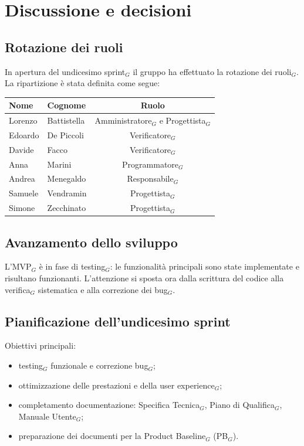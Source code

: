 \documentclass[a4paper, 10pt, colorlinks=true, linkcolor=black, urlcolor=blue, citecolor=blue, hidelinks]{article}
\begin{document}
\section{Discussione e decisioni}

\subsection{Rotazione dei ruoli}
In apertura del undicesimo sprint$_G$ il gruppo ha effettuato la rotazione dei ruoli$_G$. La ripartizione è stata definita come segue:
\begin{center}
    \begin{tabular}{|l|l|c|}
        \hline
        \textbf{Nome} & \textbf{Cognome} & \textbf{Ruolo} \\
        \hline
        Lorenzo & Battistella & Amministratore$_G$ e Progettista$_G$ \\
        \hline
        Edoardo & De Piccoli & Verificatore$_G$ \\
        \hline
        Davide & Facco & Verificatore$_G$ \\
        \hline
        Anna & Marini & Programmatore$_G$ \\
        \hline
        Andrea & Menegaldo & Responsabile$_G$ \\
        \hline
        Samuele & Vendramin & Progettista$_G$ \\
        \hline
        Simone & Zecchinato & Progettista$_G$ \\
        \hline
    \end{tabular}
\end{center}

\subsection{Avanzamento dello sviluppo}
L'MVP$_G$ è in fase di testing$_G$: le funzionalità principali sono state implementate e risultano funzionanti. L'attenzione si sposta ora dalla scrittura del codice alla verifica$_G$ sistematica e alla correzione dei bug$_G$.

\subsection{Pianificazione dell'undicesimo sprint}
Obiettivi principali:
\begin{itemize}
    \item testing$_G$ funzionale e correzione bug$_G$;
    \item ottimizzazione delle prestazioni e della user experience$_G$;
    \item completamento documentazione: Specifica Tecnica$_G$, Piano di Qualifica$_G$, Manuale Utente$_G$;
    \item preparazione dei documenti per la Product Baseline$_G$ (PB$_G$).
\end{itemize}
\end{document}
